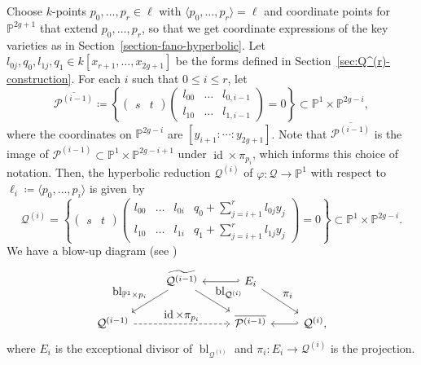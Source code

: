 \documentclass[JEP,XML,SOM,Unicode,NoEqCountersInSection,published]{cedram}
\let\ts\textstyle
\theoremstyle{plain}
\theoremstyle{definition}
\DeclareMathOperator{\bl}{bl}
\DeclareMathOperator{\id}{id}
\let\phi\varphi
\renewcommand\P{\mathbb{P}}
\begin{document}
Choose $k$\nobreakdash-points $p_0,\dots, p_r \in \ell$ with $\langle p_0,\dots, p_r\rangle =\ell$
and coordinate points for $\P^{2g+1}$ that extend $p_0,\dots, p_r$,
so that we get coordinate expressions of the key varieties as in Section~\ref{section-fano-hyperbolic}.
Let $l_{0j}, q_0, l_{1j}, q_1\in k[x_{r+1}, \dots, x_{2g+1}]$ be the forms defined in Section~\ref{sec:Q^(r)-construction}.
For each $i$ such that $0 \leq i \leq r$, let
\[
\overline{\mathcal{P}^{(i-1)}}\coloneqq
\left\{
\begin{pmatrix}
s & t
\end{pmatrix}
\begin{pmatrix}
l_{00} & \dots &l_{0, i-1}\\
l_{10} & \dots & l_{1, i-1}
\end{pmatrix}
=0
\right\}
\subset \P^1\times \P^{2g-i},
\]
where the
coordinates on \(\mathbb P^{2g-i}\) are \([y_{i+1}:\cdots:y_{2g+1}]\).
Note that \(\overline{\mathcal{P}^{(i-1)}}\) is the image of \(\mathcal P^{(i-1)}\subset\mathbb P^1\times\mathbb P^{2g-i+1}\) under \(\id\times \pi_{p_i}\), which informs this choice of notation. Then, the hyperbolic reduction $\mathcal{Q}^{(i)}$ of $\phi\colon\mathcal{Q}\to \P^1$ with respect to $\ell_i \coloneqq \langle p_0,\dots, p_i\rangle$ is given~by
\[
\mathcal{Q}^{(i)}
=
\left\{
\begin{pmatrix}
s & t
\end{pmatrix}
\begin{pmatrix}
l_{00} & \dots &l_{0i} & q_0 + \sum_{j=i+1}^r l_{0j} y_j \\
l_{10} & \dots & l_{1i} & q_1 + \sum_{j=i+1}^r l_{1j} y_j
\end{pmatrix}
=0
\right\}
\subset \P^1\times \P^{2g-i}.
\]
We have a blow-up diagram (see \cite[Rem.\,2.6]{KuznetsovShinder18})
\[
\begin{tikzcd}
& \widetilde{\mathcal{Q}^{(i-1)}} \arrow[ld, "\ts \bl_{\P^1\times p_{i}}"'] \arrow[rd, "\ts \bl_{\mathcal{Q}^{(i)}}"] & \arrow[l, hook'] E_{i} \arrow[rd, "\ts \pi_i"] &\\
\mathcal{Q}^{(i-1)} \arrow[rr, "\ts \id\times \pi_{p_{i}}", dashed]& & \overline{\mathcal{P}^{(i-1)}} & \arrow[l, hook']\mathcal{Q}^{(i)},
\end{tikzcd}
\]
where $E_{i}$ is the exceptional divisor of $\bl_{\mathcal{Q}^{(i)}}$
and $\pi_i\colon E_i\to \mathcal{Q}^{(i)}$ is the projection.
\end{document}
